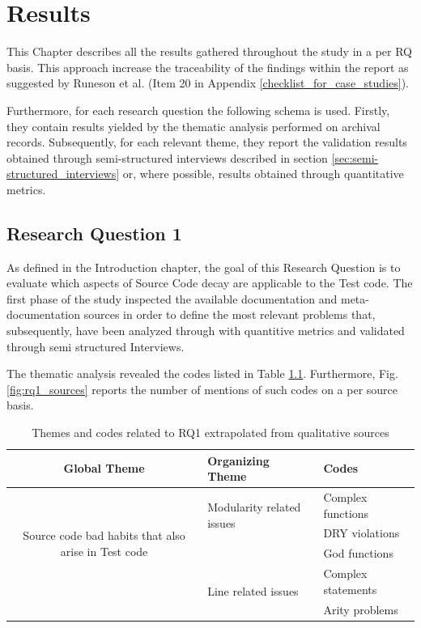 \chapter{Results} \label{study_results}

This Chapter describes all the results gathered throughout the study in a per RQ basis. This approach increase the traceability of the findings within the report as suggested by Runeson et al. \cite{case_study_software_engineering} (Item 20 in Appendix \ref{checklist_for_case_studies}).

Furthermore, for each research question the following schema is used. Firstly, they contain results yielded by the thematic analysis performed on archival records. Subsequently, for each relevant theme, they report the validation results obtained through semi-structured interviews described in section \ref{sec:semi-structured_interviews} or, where possible, results obtained through quantitative metrics.

\section{Research Question 1}

As defined in the Introduction chapter, the goal of this Research Question is to evaluate which aspects of Source Code decay are applicable to the Test code. The first phase of the study inspected the available documentation and meta-documentation sources in order to define the most relevant problems that, subsequently, have been analyzed through with quantitive metrics and validated through semi structured Interviews.

The thematic analysis revealed the codes listed in Table \ref{tab:themes_rq1}. Furthermore, Fig. \ref{fig:rq1_sources} reports the number of mentions of such codes on a per source basis.



\begin{table}
\renewcommand{\arraystretch}{1.5}
\centering
\begin{tabular}{ c p{4.3cm} p{4.6cm}}
    
    \hline       
    {\large Global Theme} & {\large Organizing Theme} & {\large Codes}\\
    \hline
    
    \multirow{4}{*}{\parbox[t]{4.3cm}{
        Source code bad habits that also arise in Test code}
    } & \multirow{2}{*}{\parbox[t]{4.3cm}{Modularity related issues}}
        & Complex functions \\
        & & DRY violations\\ 
        & & God functions\\ \cline{2-3}
        
    & \multirow{2}{*}{\parbox[t]{4.6cm}{Line related issues}}
        & Complex statements \\
        & & Arity problems \\
    \hline
\end{tabular}
\caption{Themes and codes related to RQ1 extrapolated from qualitative sources}
\label{tab:themes_rq1}
\end{table}

